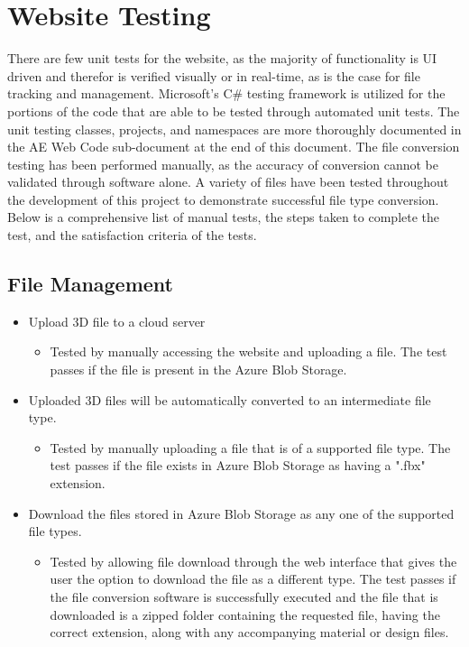 
\section{Website Testing}
\tab There are few unit tests for the website, as the majority of functionality is UI driven and therefor is verified visually or in real-time, as is the case for file tracking and management. 
Microsoft's C\# testing framework is utilized for the portions of the code that are able to be tested through automated unit tests. 
The unit testing classes, projects, and namespaces are more thoroughly documented in the AE Web Code sub-document at the end of this document.
The file conversion testing has been performed manually, as the accuracy of conversion cannot be validated through software alone. 
A variety of files have been tested throughout the development of this project to demonstrate successful file type conversion.
Below is a comprehensive list of manual tests, the steps taken to complete the test, and the satisfaction criteria of the tests.

\subsection{File Management}
\begin{itemize}
    \item Upload 3D file to a cloud server 
    \begin{itemize}
        \item Tested by manually accessing the website and uploading a file. The test passes if the file is present in the Azure Blob Storage.
    \end{itemize}

    \item Uploaded 3D files will be automatically converted to an intermediate file type.
    \begin{itemize}
        \item Tested by manually uploading a file that is of a supported file type. The test passes if the file exists in Azure Blob Storage as having a ".fbx" extension.
    \end{itemize} 

    \item Download the files stored in Azure Blob Storage as any one of the supported file types.
    \begin{itemize}
        \item Tested by allowing file download through the web interface that gives the user the option to download the file as a different type. The test passes if the file conversion software is successfully executed and the file that is downloaded is a zipped folder containing the requested file, having the correct extension, along with any accompanying material or design files.
    \end{itemize}  

\end{itemize}


